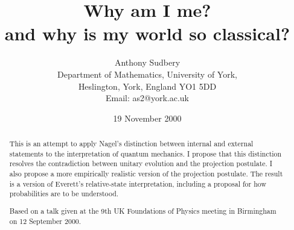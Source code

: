 \documentclass[12pt,a4paper,reqno]{article}
\renewcommand{\(}{\left(}
\renewcommand{\)}{\right)}
\newcommand{\<}{\langle}
\renewcommand{\>}{\rangle}
\theoremstyle{plain} %
\theoremstyle{definition}
\theoremstyle{remark}
\begin{document}
\title{Why am I me?\\ and why is my world so classical?}
\author{Anthony Sudbery\\[10pt] \small Department of Mathematics,    
University of York,\\[-2pt] \small Heslington, York, England YO1 5DD\\    
\small  Email: as2@york.ac.uk}
\date{19 November 2000}
\maketitle
\begin{abstract}
This is an attempt to apply Nagel's distinction between internal
and external statements to the interpretation of quantum mechanics. I
propose that this distinction resolves the contradiction between unitary
evolution and the projection postulate. I also propose a more empirically
realistic version of the projection postulate. The result is a version of
Everett's relative-state interpretation, including a proposal for how
probabilities are to be understood.

Based on a talk given at the 9th UK Foundations of Physics
meeting in Birmingham on 12 September 2000.

\end{abstract}
\end{document}
